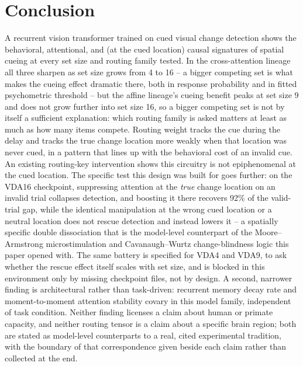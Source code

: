 \documentclass[11pt,a4paper]{article}
\begin{document}
\section{Conclusion}
A recurrent vision transformer trained on cued visual change detection shows the behavioral, attentional, and (at the cued location) causal signatures of spatial cueing at every set size and routing family tested. In the cross-attention lineage all three sharpen as set size grows from 4 to 16 -- a bigger competing set is what makes the cueing effect dramatic there, both in response probability and in fitted psychometric threshold -- but the affine lineage's cueing benefit peaks at set size 9 and does not grow further into set size 16, so a bigger competing set is not by itself a sufficient explanation: which routing family is asked matters at least as much as how many items compete. Routing weight tracks the cue during the delay and tracks the true change location more weakly when that location was never cued, in a pattern that lines up with the behavioral cost of an invalid cue. An existing routing-key intervention shows this circuitry is not epiphenomenal at the cued location. The specific test this design was built for goes further: on the VDA16 checkpoint, suppressing attention at the \emph{true} change location on an invalid trial collapses detection, and boosting it there recovers 92\% of the valid-trial gap, while the identical manipulation at the wrong cued location or a neutral location does not rescue detection and instead lowers it -- a spatially specific double dissociation that is the model-level counterpart of the Moore--Armstrong microstimulation and Cavanaugh--Wurtz change-blindness logic this paper opened with. The same battery is specified for VDA4 and VDA9, to ask whether the rescue effect itself scales with set size, and is blocked in this environment only by missing checkpoint files, not by design. A second, narrower finding is architectural rather than task-driven: recurrent memory decay rate and moment-to-moment attention stability covary in this model family, independent of task condition. Neither finding licenses a claim about human or primate capacity, and neither routing tensor is a claim about a specific brain region; both are stated as model-level counterparts to a real, cited experimental tradition, with the boundary of that correspondence given beside each claim rather than collected at the end.
\end{document}
